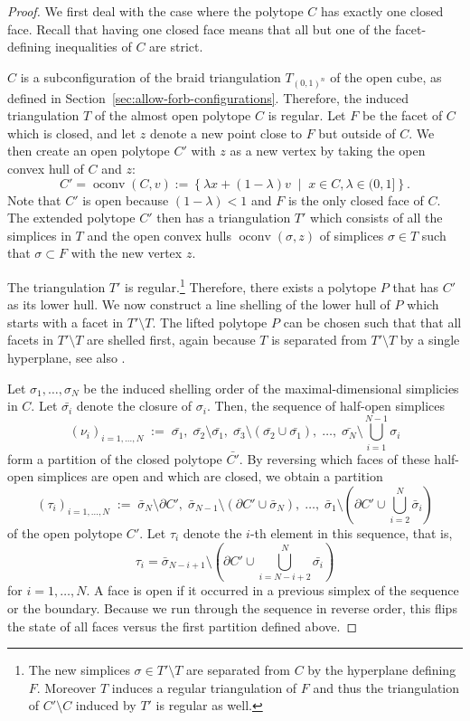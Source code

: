 \documentclass[12pt,reqno]{amsart}
\numberwithin{definition}{section}
\theoremstyle{definition}
\newcommand{\mset}[2]{ \left\{ #1 \; \middle| \; #2 \right\}}
\newcommand{\T}{T} %
\newcommand{\TC}{\T_{(0,1)^n}} %
\begin{document}
\begin{proof} 
We first deal with the case where the polytope $C$ has exactly one closed face. Recall that having one closed face means that all but one of the facet-defining inequalities of $C$ are strict.

$C$ is a subconfiguration of the braid triangulation $\TC$ of the open cube, as defined in Section~\ref{sec:allow-forb-configurations}. Therefore, the induced triangulation $T$ of the almost open polytope $C$ is regular. Let $F$ be the facet of $C$ which is closed, and let $z$ denote a new point close to $F$ but outside of $C$. We then create an open polytope $C'$ with $z$ as a new vertex by taking the open convex hull of $C$ and $z$:
\[
  C' = \operatorname{oconv}(C,v) := \mset{\lambda x + (1-\lambda)v}{x\in C, \lambda\in (0,1] }.
\]
Note that $C'$ is open because $(1-\lambda)<1$ and $F$ is the only closed face of $C$. The extended polytope $C'$ then has a triangulation $T'$ which consists of all the simplices in $T$ and the open convex hulls $\operatorname{oconv}(\sigma,z)$ of simplices $\sigma\in T$ such that $\sigma\subset F$ with the new vertex $z$. 

The triangulation $T'$ is regular.\footnote{The new simplices $\sigma\in T'\setminus T$ are separated from $C$ by the hyperplane defining $F$. Moreover $T$ induces a regular triangulation of $F$ and thus the triangulation of $C'\setminus C$ induced by $T'$ is regular as well.} Therefore, there exists a polytope $P$ that has $C'$ as its lower hull. We now construct a line shelling of the lower hull of $P$ which starts with a facet in $T'\setminus T$. The lifted polytope $P$ can be chosen such that that all facets in $T'\setminus T$ are shelled first, again because $T$ is separated from $T'\setminus T$ by a single hyperplane, see also \cite[Lemma~2]{Breuer2011}.

Let $\sigma_1,\ldots,\sigma_N$ be the induced shelling order of the maximal-dimensional simplicies in $C$. Let $\bar{\sigma_i}$ denote the closure of $\sigma_i$. Then, the sequence of half-open simplices
\[
 (\nu_i)_{i=1,\ldots,N}\;  :=\;   \bar{\sigma_1}, \; \bar{\sigma_2}\setminus \bar{\sigma_1}, \; \bar{\sigma_3}\setminus  (\bar{\sigma_2} \cup \bar{\sigma_1}), \; \ldots, \; \bar{\sigma_N} \setminus \bigcup_{i=1}^{N-1} \sigma_i
\]
form a partition of the closed polytope $\bar{C'}$. By reversing which faces of these half-open simplices are open and which are closed, we obtain a partition 
\[
  (\tau_i)_{i=1,\ldots,N}\;  :=\; \bar{\sigma}_N\setminus \partial C' ,\;  \bar{\sigma}_{N-1}\setminus (\partial C' \cup\bar{\sigma}_N),\;  \ldots,\;  \bar{\sigma}_1 \setminus  (\partial C' \cup \bigcup_{i=2}^N \bar{\sigma}_i)
\]
of the open polytope $C'$. Let $\tau_i$ denote the $i$-th element in this sequence, that is, 
\[
  \tau_i = \bar{\sigma}_{N-i+1} \setminus (\partial C' \cup \bigcup_{i=N-i+2}^N \bar{\sigma_i})
\]
for $i=1,\ldots,N$. A face is open if it occurred in a previous simplex of the sequence or the boundary. Because we run through the sequence in reverse order, this flips the state of all faces versus the first partition defined above.


\end{proof}
\end{document}
